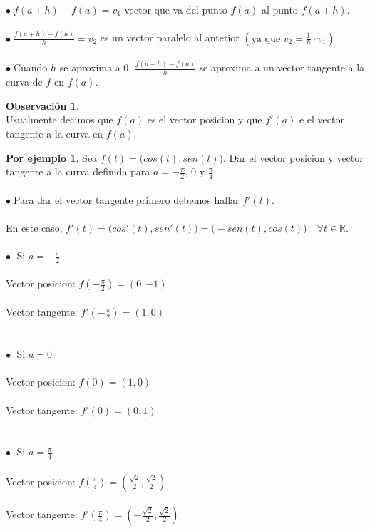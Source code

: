 \documentclass{article}
\theoremstyle{definition}
\newtheorem*{obs}{Observación}
\newtheorem*{ej}{Por ejemplo}
\theoremstyle{remark}
\newcommand\bl{$\bullet\;$}
\begin{document}
\quad \bl $f(a+h)-f(a)=v_1$ vector que va del punto $f(a)$ al punto $f(a+h)$. \\\\
\quad \bl $\frac{f(a+h)-f(a)}{h}=v_2$ es un vector paralelo al anterior $\left(\text{ya que }v_2=\frac{1}{h}\cdot v_1\right)$. \\\\
\bl Cuando $h$ se aproxima a $0$, $\frac{f(a+h)-f(a)}{h}$ se aproxima a un vector tangente a la curva de $f$ en $f(a)$.
\begin{obs}
  \; \\
  Usualmente decimos que $f(a)$ es el vector posicion y que $f'(a)$ e el vector tangente a la curva en $f(a)$.
\end{obs} \; \pagebreak
\begin{ej}
  Sea $f(t) = \big(cos(t),sen(t)\big).$ Dar el vector posicion y vector tangente a la curva definida para $a=-\frac{\pi}{2}$, $0$ y $\frac{\pi}{4}$. \\\\ 
  \bl Para dar el vector tangente primero debemos hallar $f'(t)$. \\\\
  \phantom{\bl} En este caso, $f'(t)=\big(cos'(t),sen'(t)\big)=\big(-sen(t),cos(t)\big) \quad \forall t \in \mathbb{R}$.\\\\ 
  \textcolor{rojop2}{\bl} Si $a= -\frac{\pi}{2}$ \\\\
  \quad \quad Vector posicion: $f\left(-\frac{\pi}{2}\right)=(0,-1)$\\\\
    \quad \quad Vector tangente: $f'\left(-\frac{\pi}{2}\right)=(1,0)$ \\ \\ \\ 
    \textcolor{rojop2}{\bl} Si $a=0$ \\\\
      \quad \quad Vector posicion: $f\left(0\right)=(1,0)$\\\\
    \quad \quad Vector tangente: $f'\left(0\right)=(0,1)$\\ \\ \\ 
    \textcolor{rojop2}{\bl} Si $a=\frac{\pi}{4}$ \\\\
    \quad \quad Vector posicion: $f\left(\frac{\pi}{4}\right)=\left(\frac{\sqrt{2}}{2},\frac{\sqrt{2}}{2}\right)$\\\\
    \quad \quad Vector tangente: $f'\left(\frac{\pi}{4}\right)=\left(-\frac{\sqrt{2}}{2},\frac{\sqrt{2}}{2}\right)$
\end{ej}
\begin{figure}[h]
\centering
\def\svgwidth{0.95\textwidth}

\end{figure}
\end{document}
